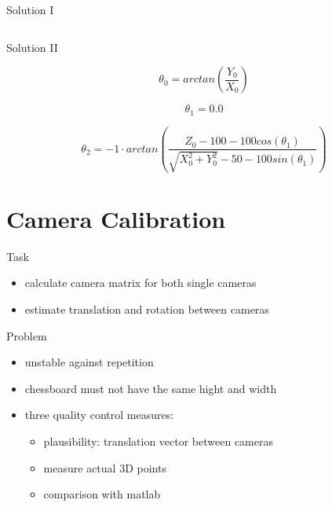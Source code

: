 \documentclass{beamer}
\begin{document}
\begin{frame}{Solution I}
\begin{columns}[T]
\begin{column}{.45\textwidth}
	\end{column}%
\end{columns}


\end{frame}

\begin{frame}{Solution II}

\begin{equation}
\theta_0 = arctan(\frac{Y_0}{X_0})
\end{equation}

\begin{equation}
\theta_1 = 0.0
\end{equation}

\begin{equation}
\theta_2 = -1 \cdot arctan \left( \frac{ Z_0 - 100 - 100 cos(\theta_1)}{\sqrt{X_{0}^{2} + Y_{0}^{2}} - 50 - 100 sin(\theta_1)} \right)
\end{equation}

\end{frame}



\section{Camera Calibration}
\frame{\tableofcontents[currentsection]}

\begin{frame}{Task}

\begin{itemize}
	\item calculate camera matrix for both single cameras \\
	\item estimate translation and rotation between cameras \\
\end{itemize}


\end{frame}

\begin{frame}{Problem}

\begin{itemize}
	\item unstable against repetition \\
	\item chessboard must not have the same hight and width \\
	\item three quality control measures: 
	\begin{itemize}
		\item plausibility: translation vector between cameras
		\item measure actual 3D points 
		\item comparison with matlab
	\end{itemize}
\end{itemize}


\end{frame}
\end{document}

